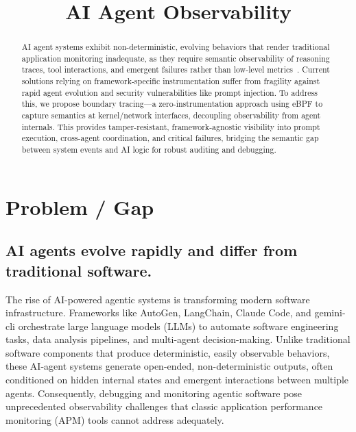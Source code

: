 \documentclass[sigplan,screen，review,9pt]{acmart}
\begin{document}
\title{AI Agent Observability}


\author{}


\sloppy
\begin{abstract}
AI agent systems exhibit non-deterministic, evolving behaviors that render traditional application monitoring inadequate, as they require semantic observability of reasoning traces, tool interactions, and emergent failures rather than low-level metrics~\cite{wang2024survey}. Current solutions relying on framework-specific instrumentation suffer from fragility against rapid agent evolution and security vulnerabilities like prompt injection. To address this, we propose boundary tracing—a zero-instrumentation approach using eBPF to capture semantics at kernel/network interfaces, decoupling observability from agent internals. This provides tamper-resistant, framework-agnostic visibility into prompt execution, cross-agent coordination, and critical failures, bridging the semantic gap between system events and AI logic for robust auditing and debugging.
\end{abstract}


\maketitle



\section{Problem / Gap}

\subsection*{AI agents evolve rapidly and differ from traditional software.}  
The rise of AI-powered agentic systems is transforming modern software infrastructure. Frameworks like AutoGen, LangChain, Claude Code, and gemini-cli orchestrate large language models (LLMs) to automate software engineering tasks, data analysis pipelines, and multi-agent decision-making. Unlike traditional software components that produce deterministic, easily observable behaviors, these AI-agent systems generate open-ended, non-deterministic outputs, often conditioned on hidden internal states and emergent interactions between multiple agents. Consequently, debugging and monitoring agentic software pose unprecedented observability challenges that classic application performance monitoring (APM) tools cannot address adequately.
\end{document}
